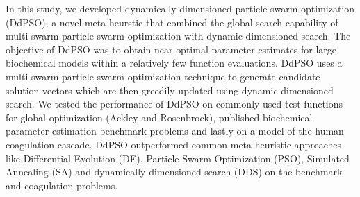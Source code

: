 \documentclass[12pt]{article}
\begin{document}
In this study, we developed dynamically dimensioned particle swarm optimization (DdPSO), a novel meta-heurstic that combined the global search capability of multi-swarm particle swarm optimization with dynamic dimensioned search. The objective of DdPSO was to obtain near optimal parameter estimates for large biochemical models within a relatively few function evaluations.
DdPSO uses a multi-swarm particle swarm optimization technique to generate candidate solution vectors which are then greedily updated using dynamic dimensioned search.
We tested the performance of DdPSO on commonly used test functions for global optimization (Ackley and Rosenbrock), published biochemical parameter estimation benchmark problems and
lastly on a model of the human coagulation cascade. DdPSO outperformed common meta-heuristic approaches like Differential Evolution (DE), Particle Swarm Optimization (PSO), Simulated Annealing (SA) and dynamically dimensioned search (DDS) on the benchmark and coagulation problems.

\end{document}
